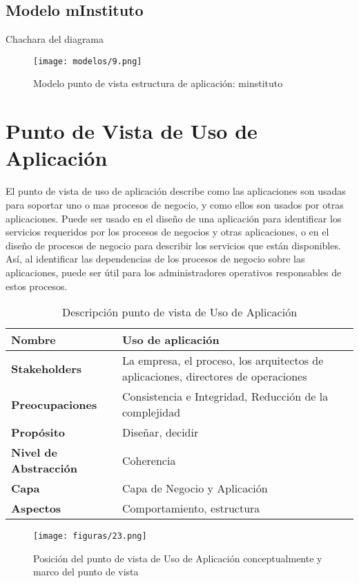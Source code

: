  \subsection{Modelo mInstituto}Chachara del diagrama
  \begin{figure}[!h]
	\centering
	\texttt{[image: modelos/9.png]}
	\captionsetup{width=.95\textwidth}
	\caption{Modelo punto de vista estructura de aplicación: minstituto}
	\label{modelo9}
  \end{figure}
  
  \section{Punto de Vista de Uso de Aplicación}
  El punto de vista de uso de aplicación describe como las aplicaciones son usadas para soportar uno o mas procesos de negocio, y como ellos son usados por otras aplicaciones. Puede ser usado en el diseño de una aplicación para identificar los servicios requeridos por los procesos de negocios y otras aplicaciones, o en el diseño de procesos de negocio para describir los servicios que están disponibles. Así, al identificar las dependencias de los procesos de negocio sobre las aplicaciones, puede ser útil para los administradores operativos responsables de estos procesos.
  
  \begin{table}[!h]
  	\centering
  	\begin{tabular}{lp{8cm}}
  		\toprule
  		\textbf{Nombre} & \textbf{Uso de aplicación} \\
  		\midrule
  		\textbf{Stakeholders} & La empresa, el proceso, los arquitectos de aplicaciones, directores de operaciones \\
  		\textbf{Preocupaciones} & Consistencia e Integridad, Reducción de la complejidad \\
  		\textbf{Propósito} & Diseñar, decidir \\
  		\textbf{Nivel de Abstracción} & Coherencia \\
  		\textbf{Capa} & Capa de Negocio y Aplicación \\
  		\textbf{Aspectos} & Comportamiento, estructura \\
  		\bottomrule
  	\end{tabular}
  	\captionsetup{width=.95\textwidth}
  	\caption{Descripción punto de vista de Uso de Aplicación}
  	\label{tabla13}
  \end{table}
  
  \begin{figure}[!h]
  	\centering
  	\texttt{[image: figuras/23.png]}
  	\captionsetup{width=.95\textwidth}
  	\caption{Posición del punto de vista de Uso de Aplicación conceptualmente y marco del punto de vista}
  	\label{figura23}
  \end{figure}
  
